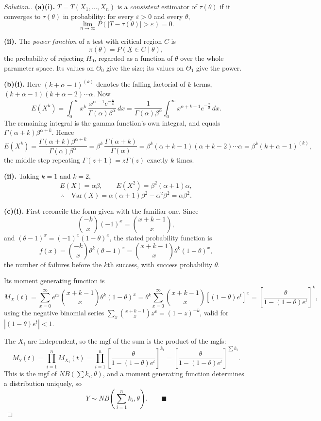 \documentclass[12pt,a4paper]{report}
\theoremstyle{definition}
\theoremstyle{plain}
\newenvironment{solution}
  {\renewcommand{\qedsymbol}{}\begin{proof}[\textit{Solution}.]}
  {\end{proof}}
\begin{document}
\begin{solution}
\textbf{(a)(i).} $T=T(X_1,\ldots,X_n)$ is a \emph{consistent} estimator of
$\tau(\theta)$ if it converges to $\tau(\theta)$ in probability: for every
$\varepsilon>0$ and every $\theta$,
\[\lim_{n\to\infty}P\left(\left|T-\tau(\theta)\right|>\varepsilon\right)=0.\]

\textbf{(ii).} The \emph{power function} of a test with critical region $C$ is
\[\pi(\theta)=P\left(\underline{X}\in C\mid\theta\right),\]
the probability of rejecting $H_0$, regarded as a function of $\theta$ over the
whole parameter space. Its values on $\Theta_0$ give the size; its values on
$\Theta_1$ give the power.

\textbf{(b)(i).} Here $(k+\alpha-1)^{(k)}$ denotes the falling factorial of $k$
terms, $(k+\alpha-1)(k+\alpha-2)\cdots\alpha$. Now
\[E\left(X^k\right)=\int_0^\infty x^k\,
\frac{x^{\alpha-1}e^{-\frac{x}{\beta}}}{\Gamma(\alpha)\beta^\alpha}\,dx
=\frac{1}{\Gamma(\alpha)\beta^\alpha}
\int_0^\infty x^{\alpha+k-1}e^{-\frac{x}{\beta}}\,dx.\]
The remaining integral is the gamma function's own integral, and equals
$\Gamma(\alpha+k)\beta^{\alpha+k}$. Hence
\[E\left(X^k\right)=\frac{\Gamma(\alpha+k)\beta^{\alpha+k}}
{\Gamma(\alpha)\beta^\alpha}
=\beta^k\,\frac{\Gamma(\alpha+k)}{\Gamma(\alpha)}
=\beta^k(\alpha+k-1)(\alpha+k-2)\cdots\alpha
=\beta^k(k+\alpha-1)^{(k)},\]
the middle step repeating $\Gamma(z+1)=z\Gamma(z)$ exactly $k$ times.

\textbf{(ii).} Taking $k=1$ and $k=2$,
\[E(X)=\alpha\beta,\qquad E\left(X^2\right)=\beta^2(\alpha+1)\alpha,\]
\[\therefore\quad\text{Var}(X)=\alpha(\alpha+1)\beta^2-\alpha^2\beta^2
=\alpha\beta^2.\]

\textbf{(c)(i).} First reconcile the form given with the familiar one. Since
\[\binom{-k}{x}(-1)^x=\binom{x+k-1}{x},\]
and $(\theta-1)^x=(-1)^x(1-\theta)^x$, the stated probability function is
\[f(x)=\binom{-k}{x}\theta^k(\theta-1)^x=\binom{x+k-1}{x}\theta^k(1-\theta)^x,\]
the number of failures before the $k$th success, with success probability
$\theta$.

Its moment generating function is
\[M_X(t)=\sum_{x=0}^\infty e^{tx}\binom{x+k-1}{x}\theta^k(1-\theta)^x
=\theta^k\sum_{x=0}^\infty\binom{x+k-1}{x}
\left[(1-\theta)e^t\right]^x
=\left[\frac{\theta}{1-(1-\theta)e^t}\right]^k,\]
using the negative binomial series $\sum_x\binom{x+k-1}{x}z^x=(1-z)^{-k}$, valid
for $\left|(1-\theta)e^t\right|<1$.

The $X_i$ are independent, so the mgf of the sum is the product of the mgfs:
\[M_Y(t)=\prod_{i=1}^nM_{X_i}(t)
=\prod_{i=1}^n\left[\frac{\theta}{1-(1-\theta)e^t}\right]^{k_i}
=\left[\frac{\theta}{1-(1-\theta)e^t}\right]^{\sum k_i}.\]
This is the mgf of $NB\left(\sum k_i,\theta\right)$, and a moment generating
function determines a distribution uniquely, so
\[Y\sim NB\left(\sum_{i=1}^nk_i,\theta\right).\qquad\blacksquare\]


\end{solution}
\end{document}
